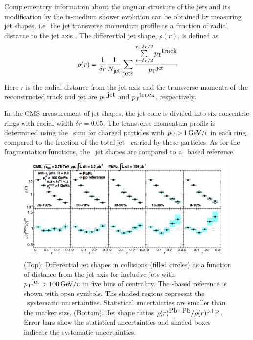 Complementary information about the angular structure of the jets and its modification
by the in-medium shower evolution can be obtained by measuring jet shapes, i.e.\ the 
jet transverse momentum profile as a function of radial distance to the jet axis
\cite{MehtarTani:2010ma,Idilbi:2008vm,CasalderreySolana:2011rz,CasalderreySolana:2011rq,Neufeld:2011yh,Blaizot:2012fh,Fickinger:2013xwa}. 
The differential jet shape, $\rho(r)$, is defined as
\begin{equation}
\rho(r) = \frac{1}{\delta r} \frac{1}{N_{\mbox{jet}}} \sum_{\mbox{jets}}
\frac{\sum\limits_{{r - \delta r/2}}^{{r + \delta r/2}}{\mbox{$p_{\mathrm{T}}$}^{\mbox{track}}}}{\mbox{$p_{\mathrm{T}}$}^{\mbox{jet}}}
\label{eq:rho(r)}
\end{equation}
Here $r$ is the radial distance from the jet axis
and the transverse momenta of the reconstructed track and jet are 
$\mbox{$p_{\mathrm{T}}$}^{\mbox{jet}}$ and $\mbox{$p_{\mathrm{T}}$}^{\mbox{track}}$, respectively.

In the CMS measurement of jet shapes, the jet cone is divided into six concentric rings 
with radial width $\delta r = 0.05$. The transverse momentum profile is determined using
the \pT\ sum for charged particles with $\mbox{$p_{\mathrm{T}}$} > 1\,\mathrm{GeV/c}$ in each ring, compared to 
the fraction of the total jet \pT\ carried by these particles. As for the fragmentation
functions, the \PbPb\ jet shapes are compared to a \pp\ based reference.

\begin{figure}[!h]
\begin{center}
\includegraphics[width=0.98\textwidth]{jetfigures/JetShapes_GR.png}
\caption{\label{fig:JSRatio}
(Top): Differential jet shapes in \PbPb collisions (filled circles)
as a function of distance from the jet axis for inclusive jets with $\mbox{$p_{\mathrm{T}}$}^{\mbox{jet}} >100\,\mathrm{GeV/c}$ 
in five bins of centrality.  The \pp-based reference is shown with open symbols.
The shaded regions represent the \PbPb\ systematic uncertainties. 
Statistical uncertainties are smaller than the marker size. 
(Bottom): Jet shape ratios $\rho(r)^{\mbox{Pb+Pb}}/\rho(r)^{\mbox{p+p}}$.
Error bars show the statistical uncertainties and shaded boxes indicate the systematic uncertainties. }
\label{fig:GR:CMS_jetshapes}
\end{center}
\end{figure}

